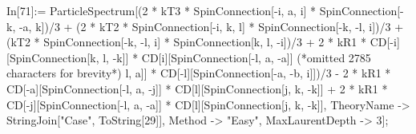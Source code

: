In[71]:= ParticleSpectrum[(2 * kT3 * SpinConnection[-i, a, i] * SpinConnection[-k, -a, k])/3 + (2 * kT2 * SpinConnection[-i, k, l] * SpinConnection[-k, -l, i])/3 + (kT2 * SpinConnection[-k, -l, i] * SpinConnection[k, l, -i])/3 + 2 * kR1 * CD[-i][SpinConnection[k, l, -k]] * CD[i][SpinConnection[-l, a, -a]] (*omitted 2785 characters for brevity*) l, a]] * CD[-l][SpinConnection[-a, -b, i]])/3 - 2 * kR1 * CD[-a][SpinConnection[-l, a, -j]] * CD[l][SpinConnection[j, k, -k]] + 2 * kR1 * CD[-j][SpinConnection[-l, a, -a]] * CD[l][SpinConnection[j, k, -k]], TheoryName -> StringJoin["Case", ToString[29]], Method -> "Easy", MaxLaurentDepth -> 3];